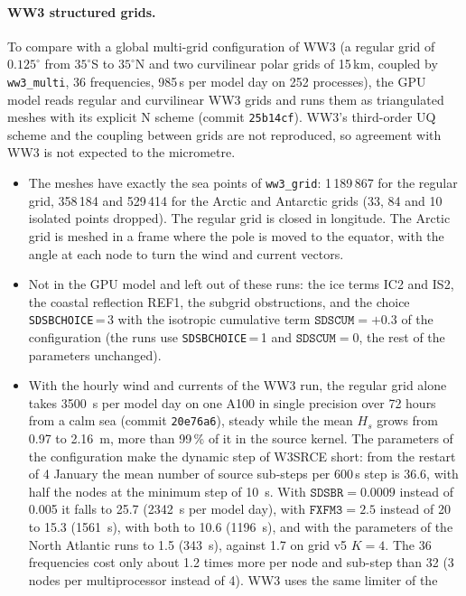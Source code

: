 \documentclass[11pt,a4paper]{article}
\begin{document}
\paragraph{WW3 structured grids.} To compare with a global
multi-grid configuration of WW3 (a regular grid of $0.125^\circ$ from
$35^\circ$S to $35^\circ$N and two curvilinear polar grids of 15\,km,
coupled by \texttt{ww3\_multi}, 36 frequencies, 985\,s per model day on
252 processes), the GPU model reads regular and curvilinear WW3 grids
and runs them as triangulated meshes with its explicit N scheme (commit
\texttt{25b14cf}). WW3's third-order UQ scheme and the coupling between
grids are not reproduced, so agreement with WW3 is not expected to the
micrometre.
\begin{itemize}
\item The meshes have exactly the sea points of \texttt{ww3\_grid}:
1\,189\,867 for the regular grid, 358\,184 and 529\,414 for the Arctic
and Antarctic grids (33, 84 and 10 isolated points dropped). The
regular grid is closed in longitude. The Arctic grid is meshed in a
frame where the pole is moved to the equator, with the angle at each
node to turn the wind and current vectors.
\item Not in the GPU model and left out of these runs: the ice terms
IC2 and IS2, the coastal reflection REF1, the subgrid obstructions, and
the choice \texttt{SDSBCHOICE}\,=\,3 with the isotropic cumulative term
$\texttt{SDSCUM}=+0.3$ of the configuration (the runs use
\texttt{SDSBCHOICE}\,=\,1 and $\texttt{SDSCUM}=0$, the rest of the
parameters unchanged).
\item With the hourly wind and currents of the WW3 run, the regular grid
alone takes \SI{3500}{s} per model day on one A100 in single precision
over 72 hours from a calm sea (commit \texttt{20e76a6}), steady while
the mean $H_s$ grows from 0.97 to \SI{2.16}{m}, more than 99\,\% of it
in the source kernel. The parameters of the configuration make the
dynamic step of W3SRCE short: from the restart of 4 January the mean
number of source sub-steps per 600\,s step is 36.6, with half the nodes
at the minimum step of \SI{10}{s}. With $\texttt{SDSBR}=0.0009$ instead
of 0.005 it falls to 25.7 (\SI{2342}{s} per model day), with
$\texttt{FXFM3}=2.5$ instead of 20 to 15.3 (\SI{1561}{s}), with both to
10.6 (\SI{1196}{s}), and with the parameters of the North Atlantic runs
to 1.5 (\SI{343}{s}), against 1.7 on grid v5 $K=4$. The 36 frequencies
cost only about 1.2 times more per node and sub-step than 32 (3 nodes
per multiprocessor instead of 4). WW3 uses the same limiter of the

\end{itemize}
\end{document}
